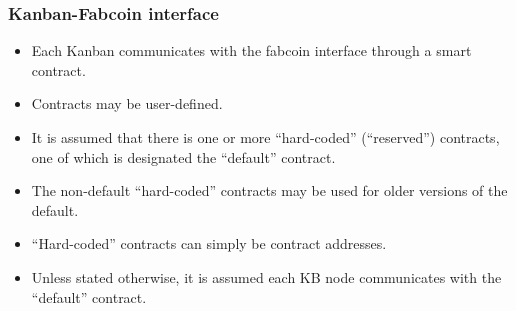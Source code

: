 \begin{frame}
\frametitle{Kanban-Fabcoin interface}
\begin{itemize}
	\item Each Kanban communicates with the fabcoin interface through a smart contract. 
	\item Contracts may be user-defined.
	\item It is assumed that there is one or more ``hard-coded'' (``reserved'') contracts, one of which is designated the ``default'' contract.
	\item The non-default ``hard-coded'' contracts may be used for older versions of the default.
	\item ``Hard-coded'' contracts can simply be contract addresses.
	\item Unless stated otherwise, it is assumed each KB node communicates with the ``default'' contract.
\end{itemize}
\end{frame}